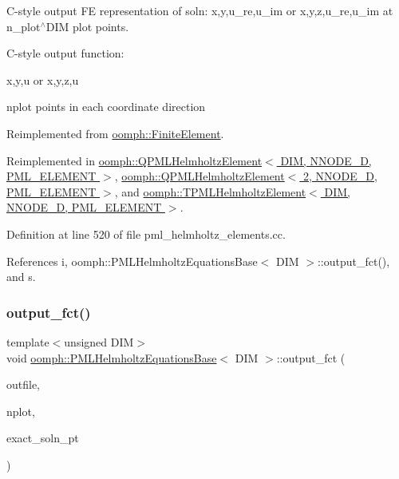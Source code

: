 C-\/style output FE representation of soln\+: x,y,u\+\_\+re,u\+\_\+im or x,y,z,u\+\_\+re,u\+\_\+im at n\+\_\+plot$^\wedge$\+D\+IM plot points. 

C-\/style output function\+:

x,y,u or x,y,z,u

nplot points in each coordinate direction 

Reimplemented from \hyperlink{classoomph_1_1FiniteElement_adfaee690bb0608f03320eeb9d110d48c}{oomph\+::\+Finite\+Element}.



Reimplemented in \hyperlink{classoomph_1_1QPMLHelmholtzElement_a9cfa0d9c0635140f394be49e15e58f93}{oomph\+::\+Q\+P\+M\+L\+Helmholtz\+Element$<$ D\+I\+M, N\+N\+O\+D\+E\+\_\+D, P\+M\+L\+\_\+\+E\+L\+E\+M\+E\+N\+T $>$}, \hyperlink{classoomph_1_1QPMLHelmholtzElement_a9cfa0d9c0635140f394be49e15e58f93}{oomph\+::\+Q\+P\+M\+L\+Helmholtz\+Element$<$ 2, N\+N\+O\+D\+E\+\_\+D, P\+M\+L\+\_\+\+E\+L\+E\+M\+E\+N\+T $>$}, and \hyperlink{classoomph_1_1TPMLHelmholtzElement_afd6b59e8e8c67ab656038b46ea573900}{oomph\+::\+T\+P\+M\+L\+Helmholtz\+Element$<$ D\+I\+M, N\+N\+O\+D\+E\+\_\+D, P\+M\+L\+\_\+\+E\+L\+E\+M\+E\+N\+T $>$}.



Definition at line 520 of file pml\+\_\+helmholtz\+\_\+elements.\+cc.



References i, oomph\+::\+P\+M\+L\+Helmholtz\+Equations\+Base$<$ D\+I\+M $>$\+::output\+\_\+fct(), and s.

\mbox{\label{classoomph_1_1PMLHelmholtzEquationsBase_ab1e06aa6838bb7136d1517f31bb95d4d}} 
\subsubsection{\texorpdfstring{output\+\_\+fct()}{output\_fct()}\hspace{0.1cm}{\footnotesize\ttfamily [1/2]}}
{\footnotesize\ttfamily template$<$unsigned D\+IM$>$ \\
void \hyperlink{classoomph_1_1PMLHelmholtzEquationsBase}{oomph\+::\+P\+M\+L\+Helmholtz\+Equations\+Base}$<$ D\+IM $>$\+::output\+\_\+fct (\begin{DoxyParamCaption}\item[{std\+::ostream \&}]{outfile,  }\item[{const unsigned \&}]{nplot,  }\item[{\hyperlink{classoomph_1_1FiniteElement_a690fd33af26cc3e84f39bba6d5a85202}{Finite\+Element\+::\+Steady\+Exact\+Solution\+Fct\+Pt}}]{exact\+\_\+soln\+\_\+pt }\end{DoxyParamCaption})\hspace{0.3cm}{\ttfamily [virtual]}}

